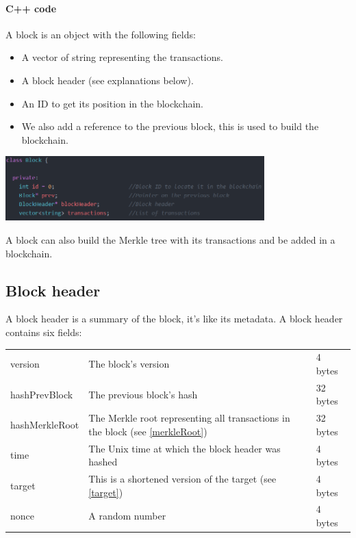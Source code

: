 \begin{aside}

\paragraph{C++ code}

A block is an object with the following fields: \newline

\begin{itemize}
  \item A vector of string representing the transactions.
  \item A block header (see explanations below).
  \item An ID to get its position in the blockchain.
  \item We also add a reference to the previous block, this is used to build the blockchain.
\end{itemize}
\medskip

\clearpage
\medskip
\includegraphics[width=10cm]{Figures/ClassBlock}
\medskip

A block can also build the Merkle tree with its transactions and be added in a blockchain.

\end{aside}
\medskip

  \subsection{Block header} \label{blockHeader}

A block header is a summary of the block, it's like its metadata. A block header contains six fields: \newline

\begin{tabular}{lll}
   version & The block's version & 4 bytes\\
   hashPrevBlock & The previous block's hash & 32 bytes \\
   hashMerkleRoot & The Merkle root representing all transactions in the block (see \ref{merkleRoot}) & 32 bytes \\
   time & The Unix time at which the block header was hashed & 4 bytes \\
   target & This is a shortened version of the target (see \ref{target}) & 4 bytes \\
   nonce & A random number  & 4 bytes \\
\end{tabular}

